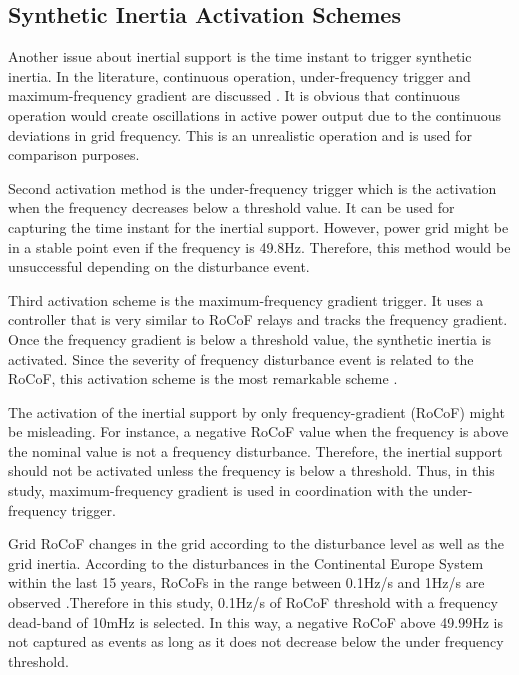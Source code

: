 \subsection{Synthetic Inertia Activation Schemes}
Another issue about inertial support is the time instant to trigger synthetic inertia. In the literature, continuous operation, under-frequency trigger and maximum-frequency gradient are discussed \cite{Gonzalez-longatt2015}. It is obvious that continuous operation would create oscillations in active power output due to the continuous deviations in grid frequency. This is an unrealistic operation and is used for comparison purposes.\par
Second activation method is the under-frequency trigger which is the activation when the frequency decreases below a threshold value. It can be used for capturing the time instant for the inertial support. However, power grid might be in a stable point even if the frequency is 49.8Hz. Therefore, this method would be unsuccessful depending on the disturbance event. \par 
Third activation scheme is the maximum-frequency gradient trigger. It uses a controller that is very similar to RoCoF relays and tracks the frequency gradient. Once the frequency gradient is below a threshold value, the synthetic inertia is activated. Since the severity of frequency disturbance event is related to the RoCoF, this activation scheme is the most remarkable scheme \cite{Gonzalez-longatt2015}. \par The activation of the inertial support by only frequency-gradient (RoCoF) might be misleading. For instance, a negative RoCoF value when the frequency is above the nominal value is not a frequency disturbance. Therefore, the inertial support should not be activated unless the frequency is below a threshold. Thus, in this study, maximum-frequency gradient is used in coordination with the under-frequency trigger. \par 
Grid RoCoF changes in the grid according to the disturbance level as well as the grid inertia. According to the disturbances in the Continental Europe System within the last 15 years, RoCoFs in the range between 0.1Hz/s and 1Hz/s are observed \cite{ENTSO-E2016}.Therefore in this study, 0.1Hz/s of RoCoF threshold with a frequency dead-band of 10mHz is selected. In this way, a negative RoCoF above 49.99Hz is not captured as events as long as it does not decrease below the under frequency threshold.
